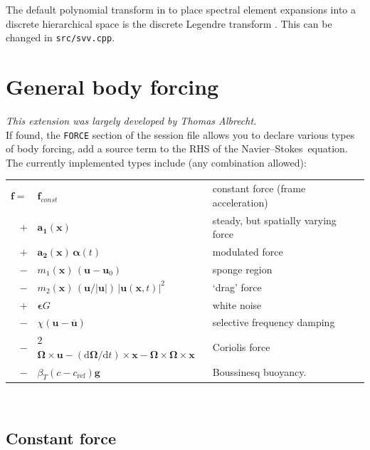 \documentclass[11pt]{report}
\newcommand\cd{\mathrm{d}} \newcommand\cD{\mathrm{D}}
\newcommand\NavSto{Navier--Stokes}
\begin{document}
The default polynomial transform in to place spectral element
expansions into a discrete hierarchical space is the discrete Legendre
transform \citep[see e.g.][]{blsc03}. This can be changed in
\verb|src/svv.cpp|.


\section{General body forcing}
\label{sec.dns_ff}

\textsl{This extension was largely developed by Thomas Albrecht.}\\

\noindent
If found, the \verb+FORCE+ section of the session file allows you to
declare various types of body forcing, \ie add a source term
to the RHS of the \NavSto\ equation. The currently implemented types
include (any combination allowed):\\[1em]
\begin{tabular}{rll}
 $ \bm{f} =$ & $\bm{f}_{const}$                           
  & constant force (frame acceleration)\\
           $+$ & $\bm{a_1}(\bm{x})$                       
  & steady, but spatially varying force\\
           $+$ & $\bm{a_2}(\bm{x}) \, \bm{\alpha}(t) $ 
  & modulated force\\
           $-$ & $m_1(\bm{x})\,(\bm{u} - \bm{u}_0)$  
  & sponge region\\
           $-$ & $m_2(\bm{x})\,(\bm{u}/|\bm{u}|)\,|\bm{u}(\bm{x}, t)|^2$  
  & `drag' force  \\
           $+$ & $\bm{\epsilon} G$                        
  & white noise    \\
           $-$ & $\chi(\bm{u}-\overline{\bm{u}})$
  & selective frequency damping \\
           $-$ & 2 $\bm{\Omega} \times \bm{u} - 
                    (\cd\bm{\Omega}/\cd t) \times \bm{x} -
                    \bm{\Omega} \times \bm{\Omega} \times \bm{x}$  
  & Coriolis force \\
           $-$ & $\beta_T(c-c_\textrm{ref})\bm{g}$
  & Boussinesq buoyancy.                
\end{tabular}\\[1em]

\subsection{Constant force}
\label{sec.constant}
\end{document}

